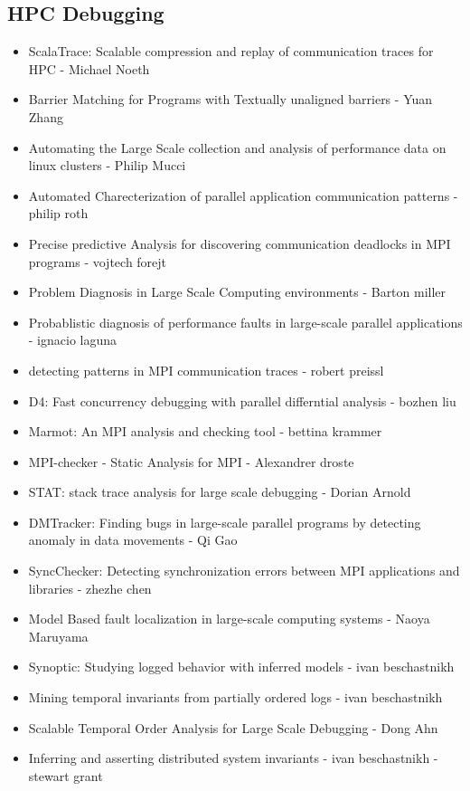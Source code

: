 \subsection{HPC Debugging}


\begin{itemize}
\item ScalaTrace: Scalable compression and replay of communication traces for HPC - Michael Noeth
\item Barrier Matching for Programs with Textually unaligned barriers - Yuan Zhang
\item Automating the Large Scale collection and analysis of performance data on linux clusters - Philip Mucci
\item Automated Charecterization of parallel application communication patterns - philip roth
\item Precise predictive Analysis for discovering communication deadlocks in MPI programs - vojtech forejt
\item Problem Diagnosis in Large Scale Computing environments - Barton miller
\item Probablistic diagnosis of performance faults in large-scale parallel applications - ignacio laguna
\item detecting patterns in MPI communication traces - robert preissl
\item D4: Fast concurrency debugging with parallel differntial analysis - bozhen liu
\item Marmot: An MPI analysis and checking tool - bettina krammer
\item MPI-checker - Static Analysis for MPI - Alexandrer droste
\item STAT: stack trace analysis for large scale debugging - Dorian Arnold 
\item DMTracker: Finding bugs in large-scale parallel programs by detecting anomaly in data movements - Qi Gao
\item SyncChecker: Detecting synchronization errors between MPI applications and libraries - zhezhe chen
\item Model Based fault localization in large-scale computing systems - Naoya Maruyama
\item Synoptic: Studying logged behavior with inferred models - ivan beschastnikh
\item Mining temporal invariants from partially ordered logs -  ivan beschastnikh
\item Scalable Temporal Order Analysis for Large Scale Debugging - Dong Ahn
\item Inferring and asserting distributed system invariants -  ivan beschastnikh - stewart grant

\end{itemize}
